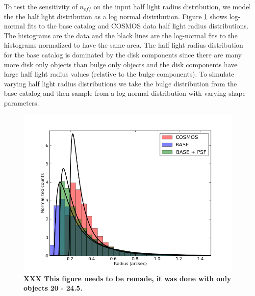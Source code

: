 \documentclass[]{article}
\begin{document}
{To test the sensitivity of $n_{eff}$ on the input half light radius distribution, we model the the half light distribution as a log normal distribution.  Figure
\ref{fig:ln_fit} shows log-normal fits to the base catalog and COSMOS data half light radius distributions.  The histograms are the data and the black lines are the
log-normal fits to the histograms normalized to have the same area.  The half light radius distribution for the base catalog is dominated by the disk components 
since there  are many more disk only objects than
bulge only objects and the disk components have large half light radius values (relative to the bulge components).  To simulate varying half light radius distributions
we take the bulge distribution from the base catalog and then
sample from a log-normal distribution with varying shape parameters.
\begin{figure}[H]
\centering
\includegraphics[width=5in]{validation_figures/ln_fit.png}
\caption{{\bf XXX This figure needs to be remade, it was done with only objects 20 - 24.5.}\label{fig:ln_fit}}
\end{figure}

}
\end{document}

